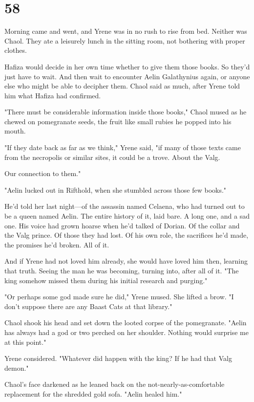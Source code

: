 
\chapter{58}

Morning came and went, and Yrene was in no rush to rise from bed.
Neither was Chaol.
They ate a leisurely lunch in the sitting room, not bothering with proper clothes.

Hafiza would decide in her own time whether to give them those books.
So they'd just have to wait.
And then wait to encounter Aelin Galathynius again, or anyone else who might be able to decipher them.
Chaol said as much, after Yrene told him what Hafiza had confirmed.

"There must be considerable information inside those books," Chaol mused as he chewed on pomegranate seeds, the fruit like small rubies he popped into his mouth.

"If they date back as far as we think," Yrene said, "if many of those texts came from the necropolis or similar sites, it could be a trove.
About the Valg.

Our connection to them."

"Aelin lucked out in Rifthold, when she stumbled across those few books."

He'd told her last night---of the assassin named Celaena, who had turned out to be a queen named Aelin.
The entire history of it, laid bare.
A long one, and a sad one.
His voice had grown hoarse when he'd talked of Dorian.
Of the collar and the Valg prince.
Of those they had lost.
Of his own role, the sacrifices he'd made, the promises he'd broken.
All of it.

And if Yrene had not loved him already, she would have loved him then, learning that truth.
Seeing the man he was becoming, turning into, after all of it.
"The king somehow missed them during his initial research and purging."

"Or perhaps some god made sure he did," Yrene mused.
She lifted a brow.
"I don't suppose there are any Baast Cats at that library."

Chaol shook his head and set down the looted corpse of the pomegranate.
"Aelin has always had a god or two perched on her shoulder.
Nothing would surprise me at this point."

Yrene considered.
"Whatever did happen with the king?
If he had that Valg demon."

Chaol's face darkened as he leaned back on the not-nearly-as-comfortable replacement for the shredded gold sofa.
"Aelin healed him."

